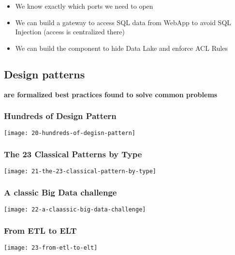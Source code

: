 \begin{itemize}
	\item We know exactly which ports we need to open
	\item We can build a gateway to access SQL data from WebApp to avoid SQL Injection (access is centralized there)
	\item We can build the component to hide Data Lake and enforce ACL Rules
\end{itemize}

\subsection{Design patterns}
\textbf{are formalized best practices found to solve common problems}

\subsubsection{Hundreds of Design Pattern}
\begin{center}
\texttt{[image: 20-hundreds-of-degisn-pattern]}
\end{center}

\subsubsection{The 23 Classical Patterns by Type}
\begin{center}
\texttt{[image: 21-the-23-classical-pattern-by-type]}
\end{center}

\subsubsection{A classic Big Data challenge}
\begin{center}
\texttt{[image: 22-a-claassic-big-data-challenge]}
\end{center}

\subsubsection{From ETL to ELT}
\begin{center}
\texttt{[image: 23-from-etl-to-elt]}
\end{center}
